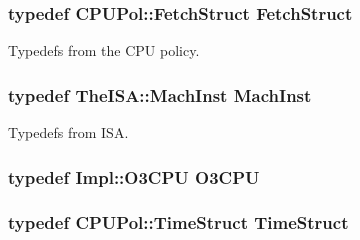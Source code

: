 \hypertarget{classDefaultFetch_a3aac8607069f16898ef53cfaa2d97aeb}{
\subsubsection[{FetchStruct}]{\setlength{\rightskip}{0pt plus 5cm}typedef CPUPol::FetchStruct {\bf FetchStruct}}}
\label{classDefaultFetch_a3aac8607069f16898ef53cfaa2d97aeb}
Typedefs from the CPU policy. \hypertarget{classDefaultFetch_a4617f528417b8f55f809ae0988284c9b}{
\subsubsection[{MachInst}]{\setlength{\rightskip}{0pt plus 5cm}typedef TheISA::MachInst {\bf MachInst}}}
\label{classDefaultFetch_a4617f528417b8f55f809ae0988284c9b}
Typedefs from ISA. \hypertarget{classDefaultFetch_a44622cf06940413482836cb62931ac3f}{
\subsubsection[{O3CPU}]{\setlength{\rightskip}{0pt plus 5cm}typedef Impl::O3CPU {\bf O3CPU}}}
\label{classDefaultFetch_a44622cf06940413482836cb62931ac3f}
\hypertarget{classDefaultFetch_ab7dd3632ef639702a5c6e7c2c3a2f82a}{
\subsubsection[{TimeStruct}]{\setlength{\rightskip}{0pt plus 5cm}typedef CPUPol::TimeStruct {\bf TimeStruct}}}
\label{classDefaultFetch_ab7dd3632ef639702a5c6e7c2c3a2f82a}


